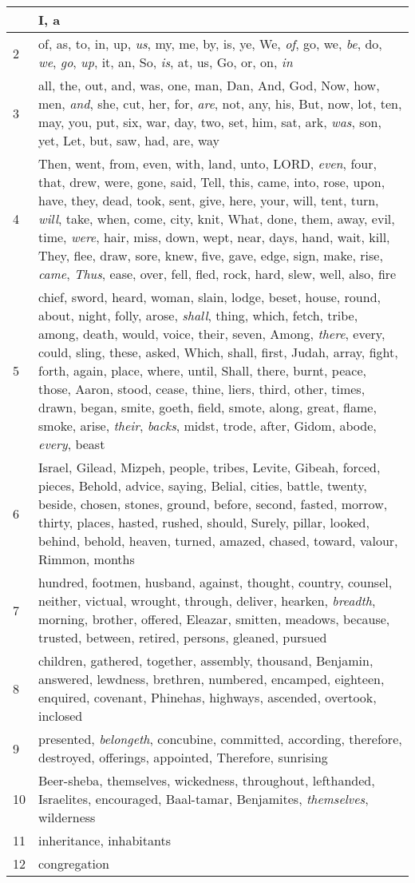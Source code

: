 \begin{longtable}{l|p{3.75in}}
\hline \hline
\endlastfoot
1 & I, a \\ \hline
2 & of, as, to, in, up, \emph{us}, my, me, by, is, ye, We, \emph{of}, go, we, \emph{be}, do, \emph{we}, \emph{go}, \emph{up}, it, an, So, \emph{is}, at, us, Go, or, on, \emph{in} \\ \hline
3 & all, the, out, and, was, one, man, Dan, And, God, Now, how, men, \emph{and}, she, cut, her, for, \emph{are}, not, any, his, But, now, lot, ten, may, you, put, six, war, day, two, set, him, sat, ark, \emph{was}, son, yet, Let, but, saw, had, are, way \\ \hline
4 & Then, went, from, even, with, land, unto, LORD, \emph{even}, four, that, drew, were, gone, said, Tell, this, came, into, rose, upon, have, they, dead, took, sent, give, here, your, will, tent, turn, \emph{will}, take, when, come, city, knit, What, done, them, away, evil, time, \emph{were}, hair, miss, down, wept, near, days, hand, wait, kill, They, flee, draw, sore, knew, five, gave, edge, sign, make, rise, \emph{came}, \emph{Thus}, ease, over, fell, fled, rock, hard, slew, well, also, fire \\ \hline
5 & chief, sword, heard, woman, slain, lodge, beset, house, round, about, night, folly, arose, \emph{shall}, thing, which, fetch, tribe, among, death, would, voice, their, seven, Among, \emph{there}, every, could, sling, these, asked, Which, shall, first, Judah, array, fight, forth, again, place, where, until, Shall, there, burnt, peace, those, Aaron, stood, cease, thine, liers, third, other, times, drawn, began, smite, goeth, field, smote, along, great, flame, smoke, arise, \emph{their}, \emph{backs}, midst, trode, after, Gidom, abode, \emph{every}, beast \\ \hline
6 & Israel, Gilead, Mizpeh, people, tribes, Levite, Gibeah, forced, pieces, Behold, advice, saying, Belial, cities, battle, twenty, beside, chosen, stones, ground, before, second, fasted, morrow, thirty, places, hasted, rushed, should, Surely, pillar, looked, behind, behold, heaven, turned, amazed, chased, toward, valour, Rimmon, months \\ \hline
7 & hundred, footmen, husband, against, thought, country, counsel, neither, victual, wrought, through, deliver, hearken, \emph{breadth}, morning, brother, offered, Eleazar, smitten, meadows, because, trusted, between, retired, persons, gleaned, pursued \\ \hline
8 & children, gathered, together, assembly, thousand, Benjamin, answered, lewdness, brethren, numbered, encamped, eighteen, enquired, covenant, Phinehas, highways, ascended, overtook, inclosed \\ \hline
9 & presented, \emph{belongeth}, concubine, committed, according, therefore, destroyed, offerings, appointed, Therefore, sunrising \\ \hline
10 & Beer-sheba, themselves, wickedness, throughout, lefthanded, Israelites, encouraged, Baal-tamar, Benjamites, \emph{themselves}, wilderness \\ \hline
11 & inheritance, inhabitants \\ \hline
12 & congregation \\ \hline
\end{longtable}
